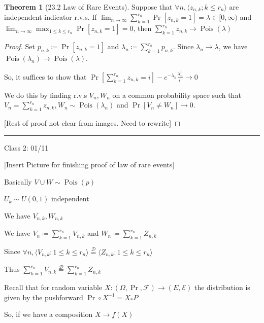\documentclass{article}
\theoremstyle{definition}
\newtheorem{theorem}{Theorem}
\newcommand{\Pois}{\operatorname{Pois}}
\begin{document}
\begin{theorem}[23.2 Law of Rare Events]
    Suppose that \(\forall n, \langle z_{n,k}; k\leq r_{n}  \rangle \) are independent indicator r.v.s. If \(\displaystyle \lim_{n \to \infty} \sum_{k=1}^{r_{n}} \Pr[z_{n,k}=1]=\lambda \in [0,\infty)\) and \(\displaystyle \lim_{n \to \infty} \max _{1\leq k\leq r_{n} }\Pr[z_{n,k}=1]=0\), then \(\displaystyle \sum_{k=1}^{r_{n} } z_{n,k} \to \Pois(\lambda)\)
\end{theorem}

\begin{proof}
    Set \(p_{n,k} \coloneqq  \Pr[z_{n,k}=1]\) and \(\lambda_{n} \coloneqq \displaystyle \sum_{k=1}^{r_n} p_{n,k}\). Since \(\lambda_n \to  \lambda \), we have \(\Pois(\lambda _{n} ) \to \Pois(\lambda )\).
    
    So, it suffices to show that \(\displaystyle \Pr \left[ \sum_{k=1}^{r_{n} } z_{n,k} = i \right] - e^{-\lambda_n}\frac{\lambda_{n}^i}{i!} \to 0\)
    
    We do this by finding r.v.s \(V_n,W_n\) on a common probability space such that \(\displaystyle V_n=\sum_{k=1}^{r_n} z_{n,k} , W_n\sim \Pois(\lambda _{n} )\) and \(\Pr[V_n\neq W_n]\to 0\).
    
    [Rest of proof not clear from images. Need to rewrite]

\end{proof}


\hrule
\hfil

Class 2: 01/11

[Insert Picture for finishing proof of law of rare events]

Basically \(V \cup W \sim \Pois(p)\)

\(U_{k} \sim U(0,1)\) independent

We have \(V_{n,k},W_{n,k}\) 

We have \(V_{n}\coloneqq \sum_{k=1}^{r_{n} } V_{n,k}\) and \(W_{n}\coloneqq \sum_{k=1}^{r_{n} } Z_{n,k}\) 

Since \(\forall n, \langle V_{n,k}:1\leq k\leq r_{n}  \rangle \overset{\mathcal{D}}{=} \langle Z_{n,k}:1\leq k\leq r_{n} \rangle \) 

Thus \(\sum_{k=1}^{r_{n} } V_{n,k}\overset{\mathcal{D} }{=} \sum_{k=1}^{r_{n} } Z_{n,k}\) 

Recall that for random variable \(X:(\Omega ,\Pr,\mathcal{F} )\to (E,\mathcal{E})\) the distribution is given by the pushforward \(\Pr\circ X^{-1}=X_{\ast} P\) 

So, if we have a composition \(X\to f(X)\) 
\end{document}
